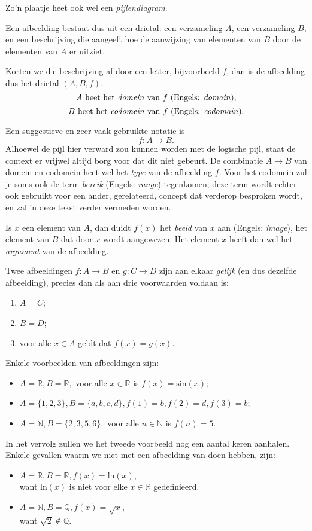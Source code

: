 Zo'n plaatje heet ook wel een \textit{pijlendiagram}.

Een afbeelding bestaat dus uit een drietal: een verzameling $A$, een verzameling $B$, en een beschrijving die aangeeft hoe de aanwijzing van elementen van $B$ door de elementen van $A$ er uitziet.

Korten we die beschrijving af door een letter, bijvoorbeeld $f$, dan is de afbeelding dus het drietal $(A, B, f)$.
$$A\text{ heet het \textit{domein} van }f\text{ (Engels: \textit{domain}),}$$
$$B\text{ heet het \textit{codomein} van }f\text{ (Engels: \textit{codomain}).}$$

Een suggestieve en zeer vaak gebruikte notatie is
$$f: A\rightarrow B.$$
Alhoewel de pijl hier verward zou kunnen worden met de logische pijl, staat de context er vrijwel altijd borg voor dat dit niet gebeurt. De combinatie $A\rightarrow B$ van domein en codomein heet wel het \textit{type} van de afbeelding $f$. Voor het codomein zul je soms ook de term \textit{bereik} (Engels: \textit{range}) tegenkomen; deze term wordt echter ook gebruikt voor een ander, gerelateerd, concept dat verderop besproken wordt, en zal in deze tekst verder vermeden worden.

Is $x$ een element van $A$, dan duidt $f(x)$ het \textit{beeld} van $x$ aan (Engels: \textit{image}), het element van $B$ dat door $x$ wordt aangewezen. Het element $x$ heeft dan wel het \textit{argument} van de afbeelding.

Twee afbeeldingen $f:A\rightarrow B$ en $g:C\rightarrow D$ zijn aan elkaar \textit{gelijk} (en dus dezelfde afbeelding), precies dan als aan drie voorwaarden voldaan is:
\begin{enumerate}
    \item $A = C$;
    \item $B = D$;
    \item voor alle $x\in A$ geldt dat $f(x) = g(x)$.
\end{enumerate}
\begin{example}
Enkele voorbeelden van afbeeldingen zijn:
\begin{itemize}
    \item $A=\mathbb{R}, B=\mathbb{R},$ voor alle $x\in\mathbb{R}$ is $f(x)=\text{sin}(x)$;
    \item $A=\{1, 2, 3\}, B=\{a, b, c, d\}, f(1)= b, f(2) = d, f(3) = b$;
    \item $A=\mathbb{N}, B=\{2,3,5,6\},$ voor alle $n\in\mathbb{N}$ is $f(n)=5$.
\end{itemize}
In het vervolg zullen we het tweede voorbeeld nog een aantal keren aanhalen. Enkele gevallen waarin we niet met een afbeelding van doen hebben, zijn:
\begin{itemize}
    \item $A=\mathbb{R}, B=\mathbb{R}, f(x)=\text{ln}(x)$,\\ want $\text{ln}(x)$ is niet voor elke $x\in\mathbb{R}$ gedefinieerd.
    \item $A=\mathbb{N}, B=\mathbb{Q}, f(x)=\sqrt{x}$,\\ want $\sqrt{2}\not\in\mathbb{Q}$.
\end{itemize}\label{vb:func}
\end{example}

